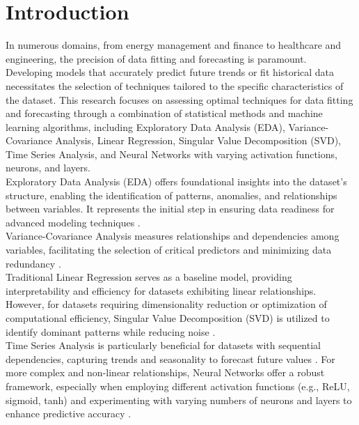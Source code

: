 \documentclass[english,12pt, titlepage]{article}
\begin{document}
	
	\newpage
	
	\tableofcontents
	
	\newpage
	
	
	
	
	
	
	\section{Introduction}
	In numerous domains, from energy management and finance to healthcare and engineering, the precision of data fitting and forecasting is paramount. Developing models that accurately predict future trends or fit historical data necessitates the selection of techniques tailored to the specific characteristics of the dataset. This research focuses on assessing optimal techniques for data fitting and forecasting through a combination of statistical methods and machine learning algorithms, including Exploratory Data Analysis (EDA), Variance-Covariance Analysis, Linear Regression, Singular Value Decomposition (SVD), Time Series Analysis, and Neural Networks with varying activation functions, neurons, and layers.\\
	
	Exploratory Data Analysis (EDA) offers foundational insights into the dataset's structure, enabling the identification of patterns, anomalies, and relationships between variables. It represents the initial step in ensuring data readiness for advanced modeling techniques \cite{jt}.\\
	
	Variance-Covariance Analysis measures relationships and dependencies among variables, facilitating the selection of critical predictors and minimizing data redundancy \cite{jw}.\\
	
	Traditional Linear Regression serves as a baseline model, providing interpretability and efficiency for datasets exhibiting linear relationships. However, for datasets requiring dimensionality reduction or optimization of computational efficiency, Singular Value Decomposition (SVD) is utilized to identify dominant patterns while reducing noise \cite{gvl}.\\
	
	Time Series Analysis is particularly beneficial for datasets with sequential dependencies, capturing trends and seasonality to forecast future values \cite{box}. For more complex and non-linear relationships, Neural Networks offer a robust framework, especially when employing different activation functions (e.g., ReLU, sigmoid, tanh) and experimenting with varying numbers of neurons and layers to enhance predictive accuracy \cite{gf}.\\
	
\end{document}
